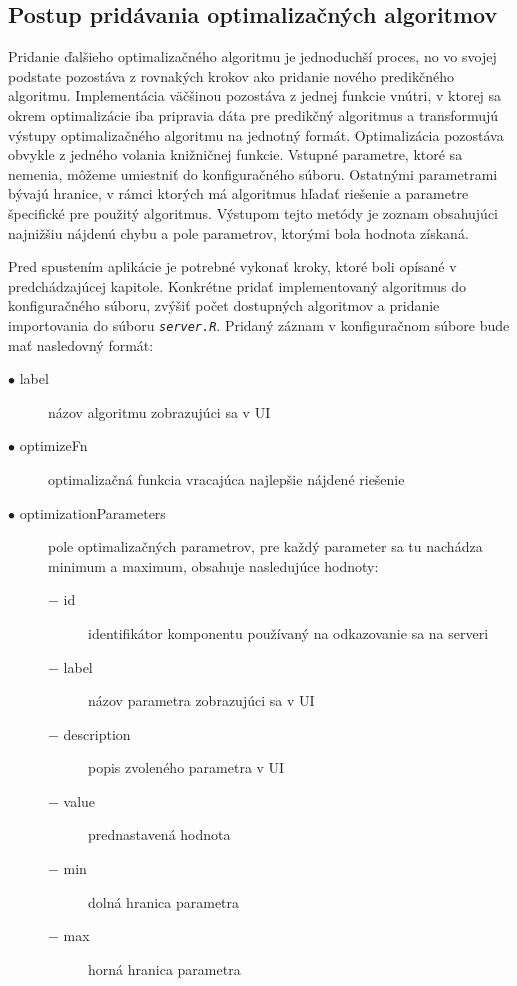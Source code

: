 \documentclass[a4paper,slovak,12pt,appendix]{article}
\begin{document}

\subsection{Postup pridávania optimalizačných algoritmov}
Pridanie ďalšieho optimalizačného algoritmu je jednoduchší proces, no vo
svojej podstate pozostáva z rovnakých krokov ako pridanie nového predikčného
algoritmu. Implementácia väčšinou pozostáva z jednej funkcie vnútri, v ktorej sa
okrem optimalizácie iba pripravia dáta pre predikčný algoritmus a transformujú
výstupy optimalizačného algoritmu na jednotný formát. Optimalizácia pozostáva
obvykle z jedného volania knižničnej funkcie. Vstupné parametre, ktoré sa
nemenia, môžeme umiestniť do konfiguračného súboru. Ostatnými parametrami bývajú
hranice, v rámci ktorých má algoritmus hľadať riešenie a parametre špecifické
pre použitý algoritmus. Výstupom tejto metódy je zoznam obsahujúci najnižšiu
nájdenú chybu a pole parametrov, ktorými bola hodnota získaná.

Pred spustením aplikácie je potrebné vykonať kroky, ktoré boli opísané
v predchádzajúcej kapitole. Konkrétne pridať implementovaný algoritmus do
konfiguračného súboru, zvýšiť počet dostupných algoritmov a pridanie
importovania do súboru \texttt{\textit{server.R}}. Pridaný záznam v konfiguračnom súbore
bude mať nasledovný formát:
\begin{description}
  \item[$\bullet$ label] názov algoritmu zobrazujúci sa v UI
  \item[$\bullet$ optimizeFn] optimalizačná funkcia vracajúca najlepšie nájdené riešenie
  \item[$\bullet$ optimizationParameters] pole optimalizačných parametrov, pre každý parameter sa
  tu nachádza minimum a maximum, obsahuje nasledujúce hodnoty:
  \begin{description}
    \item[$-$ id] identifikátor komponentu používaný na odkazovanie sa na serveri
    \item[$-$ label] názov parametra zobrazujúci sa v UI
		\item[$-$ description] popis zvoleného parametra v UI
    \item[$-$ value] prednastavená hodnota
    \item[$-$ min] dolná hranica parametra
    \item[$-$ max] horná hranica parametra
  \end{description}
\end{description}
\end{document}
